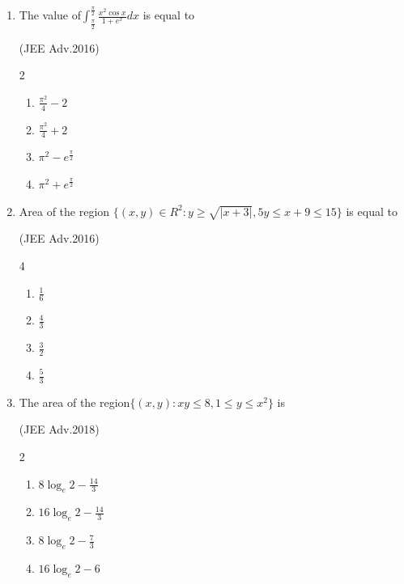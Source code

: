 \documentclass[journal,12pt,twocolumn]{IEEEtran}
\theoremstyle{remark}
\begin{document}
\begin{enumerate}
		\hfill{(JEE Adv.2014)}
		\begin{enumerate}
			\item $\int_{0}^{log(1+\sqrt{2})}2(e^u+e^{-u})^{16} du$
			\item $\int_{0}^{log(1+\sqrt{2})}(e^u+e^{-u})^{17} du$
			\item $\int_{0}^{log(1+\sqrt{2})}(e^u-e^{-u})^{17} du$
			\item $\int_{0}^{log(1+\sqrt{2})}2(e^u-e^{-u})^{16} du$
		\end{enumerate}
	\item 
		The value of$\int_{\frac{\pi}{2}}^{\frac{\pi}{2}}\frac{x^2\cos x}{1+e^x} dx$ is equal to

		\hfill{(JEE Adv.2016)}
		\begin{multicols}{2}
		\begin{enumerate}
			\item $\frac{\pi^2}{4}-2$
			\item $\frac{\pi^2}{4}+2$
                        \item $\pi^2-e^{\frac{\pi}{2}}$
			\item $\pi^2+e^{\frac{\pi}{2}}$
		\end{enumerate}
		\end{multicols}
	\item
		Area of the region $\{(x,y)\in R^2:y\geq\sqrt{|x+3|},5y\leq x+9\leq15\}$ is equal to

		\hfill{(JEE Adv.2016)}
		\begin{multicols}{4}
		\begin{enumerate}
			\item $\frac{1}{6}$
			\item $\frac{4}{3}$
			\item $\frac{3}{2}$
			\item $\frac{5}{3}$
		\end{enumerate}
		\end{multicols}
	\item
		The area of the region$\{(x,y):xy\leq8,1\leq{y}\leq{x^2}\}$ is

		\hfill{(JEE Adv.2018)}
		\begin{multicols}{2}
		\begin{enumerate}
			\item $8\log_e2-\frac{14}{3}$
			\item $16\log_e2-\frac{14}{3}$
			\item $8\log_e2-\frac{7}{3}$
			\item $16\log_e2-6$
		\end{enumerate}
		\end{multicols}

\end{enumerate}
\end{document}
